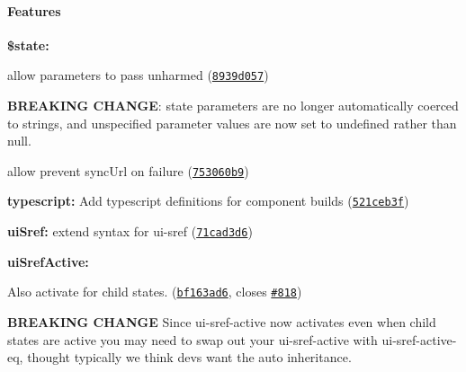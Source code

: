 {\bfseries {\bfseries {\bfseries {\bfseries \paragraph*{Features}}}}}

{\bfseries {\bfseries {\bfseries {\bfseries }}}}

{\bfseries {\bfseries {\bfseries {\bfseries 
\begin{DoxyItemize}
\item {\bfseries \$state\+:}
\begin{DoxyItemize}
\item allow parameters to pass unharmed (\href{https://github.com/angular-ui/ui-router/commit/8939d0572ab1316e458ef016317ecff53131a822}{\tt 8939d057})
\begin{DoxyItemize}
\item {\bfseries B\+R\+E\+A\+K\+I\+NG C\+H\+A\+N\+GE}\+: state parameters are no longer automatically coerced to strings, and unspecified parameter values are now set to undefined rather than null.
\end{DoxyItemize}
\item allow prevent sync\+Url on failure (\href{https://github.com/angular-ui/ui-router/commit/753060b910d5d2da600a6fa0757976e401c33172}{\tt 753060b9})
\end{DoxyItemize}
\item {\bfseries typescript\+:} Add typescript definitions for component builds (\href{https://github.com/angular-ui/ui-router/commit/521ceb3fd7850646422f411921e21ce5e7d82e0f}{\tt 521ceb3f})
\item {\bfseries ui\+Sref\+:} extend syntax for ui-\/sref (\href{https://github.com/angular-ui/ui-router/commit/71cad3d636508b5a9fe004775ad1f1adc0c80c3e}{\tt 71cad3d6})
\item {\bfseries ui\+Sref\+Active\+:}
\begin{DoxyItemize}
\item Also activate for child states. (\href{https://github.com/angular-ui/ui-router/commit/bf163ad6ce176ce28792696c8302d7cdf5c05a01}{\tt bf163ad6}, closes \href{https://github.com/angular-ui/ui-router/issues/818}{\tt \#818})
\begin{DoxyItemize}
\item {\bfseries B\+R\+E\+A\+K\+I\+NG C\+H\+A\+N\+GE} Since ui-\/sref-\/active now activates even when child states are active you may need to swap out your ui-\/sref-\/active with ui-\/sref-\/active-\/eq, thought typically we think devs want the auto inheritance.

\end{DoxyItemize}
\end{DoxyItemize}
\end{DoxyItemize}}}}}
